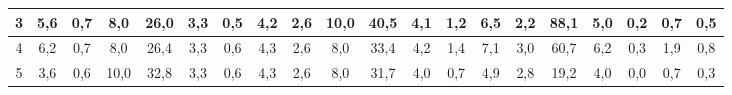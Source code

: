 \begin{sidewaystable}[]
\begin{tabular}{|c|c|c|c|c|c|c|c|c|c|c|c|c|c|c|c|c|c|c|c|}
    3  & 5,6                                              & 0,7                                              & 8,0                                              & 26,0                                             & 3,3                                              & 0,5                                              & 4,2                                              & 2,6                                              & 10,0                                             & 40,5                                             & 4,1                                              & 1,2                                              & 6,5                                              & 2,2                                              & 88,1                                             & 5,0                                              & 0,2                                              & 0,7                                              & 0,5                                              \\ \hline
    4  & 6,2                                              & 0,7                                              & 8,0                                              & 26,4                                             & 3,3                                              & 0,6                                              & 4,3                                              & 2,6                                              & 8,0                                              & 33,4                                             & 4,2                                              & 1,4                                              & 7,1                                              & 3,0                                              & 60,7                                             & 6,2                                              & 0,3                                              & 1,9                                              & 0,8                                              \\ \hline
    5  & 3,6                                              & 0,6                                              & 10,0                                             & 32,8                                             & 3,3                                              & 0,6                                              & 4,3                                              & 2,6                                              & 8,0                                              & 31,7                                             & 4,0                                              & 0,7                                              & 4,9                                              & 2,8                                              & 19,2                                             & 4,0                                              & 0,0                                              & 0,7                                              & 0,3                                              \\ \hline

\end{tabular}
\end{sidewaystable}
